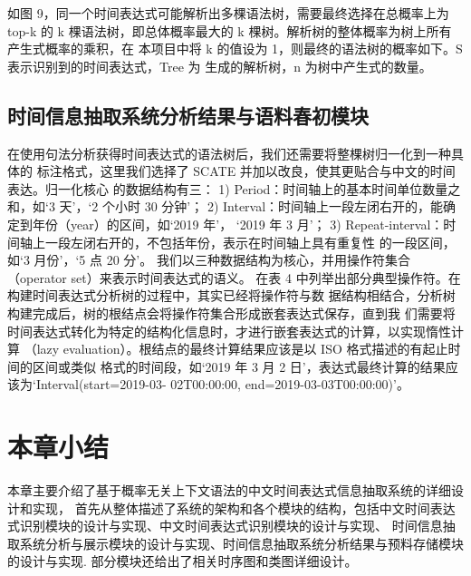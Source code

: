 如图 9，同一个时间表达式可能解析出多棵语法树，需要最终选择在总概率上为 top-k 的
k 棵语法树，即总体概率最大的 k 棵树。解析树的整体概率为树上所有产生式概率的乘积，在
本项目中将 k 的值设为 1，则最终的语法树的概率如下。S 表示识别到的时间表达式，Tree 为
生成的解析树，n 为树中产生式的数量。


\subsection{时间信息抽取系统分析结果与语料春初模块}

在使用句法分析获得时间表达式的语法树后，我们还需要将整棵树归一化到一种具体的
标注格式，这里我们选择了 SCATE 并加以改良，使其更贴合与中文的时间表达。归一化核心
的数据结构有三：
1) Period：时间轴上的基本时间单位数量之和，如‘3 天’，‘2 个小时 30 分钟’；
2) Interval：时间轴上一段左闭右开的，能确定到年份（year）的区间，如‘2019 年’，
‘2019 年 3 月’；
3) Repeat-interval：时间轴上一段左闭右开的，不包括年份，表示在时间轴上具有重复性
的一段区间，如‘3 月份’，‘5 点 20 分’。
我们以三种数据结构为核心，并用操作符集合（operator set）来表示时间表达式的语义。
在表 4 中列举出部分典型操作符。在构建时间表达式分析树的过程中，其实已经将操作符与数
据结构相结合，分析树构建完成后，树的根结点会将操作符集合形成嵌套表达式保存，直到我
们需要将时间表达式转化为特定的结构化信息时，才进行嵌套表达式的计算，以实现惰性计算
（lazy evaluation）。根结点的最终计算结果应该是以 ISO 格式描述的有起止时间的区间或类似
格式的时间段，如‘2019 年 3 月 2 日’，表达式最终计算的结果应该为‘Interval(start=2019-03-
02T00:00:00, end=2019-03-03T00:00:00)’。


\section{本章小结}

本章主要介绍了基于概率无关上下文语法的中文时间表达式信息抽取系统的详细设计和实现，
首先从整体描述了系统的架构和各个模块的结构，包括中文时间表达式识别模块的设计与实现、中文时间表达式识别模块的设计与实现、
时间信息抽取系统分析与展示模块的设计与实现、时间信息抽取系统分析结果与预料存储模块的设计与实现.
部分模块还给出了相关时序图和类图详细设计。
